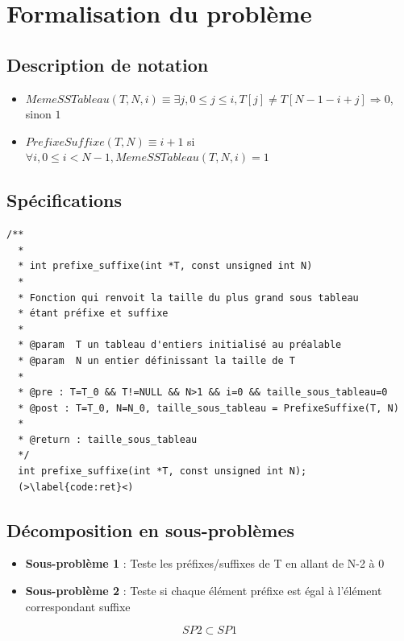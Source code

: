 \documentclass[a4paper, 11pt, oneside]{article}
\begin{document}
\section{Formalisation du problème}

\subsection{Description de notation}
  \begin{itemize}
  \item $MemeSSTableau(T,N,i)\equiv \exists j, 0\leq j\leq i, T[j]\neq T[N-1-i+j]\Rightarrow 0$, sinon $1$
  \item $PrefixeSuffixe(T,N)\equiv i+1$ si $\forall i, 0\leq i< N-1, MemeSSTableau(T, N, i)=1$
  \end{itemize}
\newpage
\subsection{Spécifications}

\begin{lstlisting}[caption={Spécification fonction prefixe\_suffixe}]
  /**
  *
  * int prefixe_suffixe(int *T, const unsigned int N)
  *
  * Fonction qui renvoit la taille du plus grand sous tableau 
  * étant préfixe et suffixe
  *
  * @param  T un tableau d'entiers initialisé au préalable
  * @param  N un entier définissant la taille de T
  *
  * @pre : T=T_0 && T!=NULL && N>1 && i=0 && taille_sous_tableau=0
  * @post : T=T_0, N=N_0, taille_sous_tableau = PrefixeSuffixe(T, N)
  *
  * @return : taille_sous_tableau
  */
  int prefixe_suffixe(int *T, const unsigned int N);
  (>\label{code:ret}<)
\end{lstlisting}

\subsection{Décomposition en sous-problèmes}
\begin{itemize}
  \item \textbf{Sous-problème 1} : Teste les préfixes/suffixes de T
en allant de N-2 à 0
  \item \textbf{Sous-problème 2} : Teste si chaque élément préfixe
est égal à l'élément correspondant suffixe 
\end{itemize}
$$SP2\subset SP1$$
\end{document}

